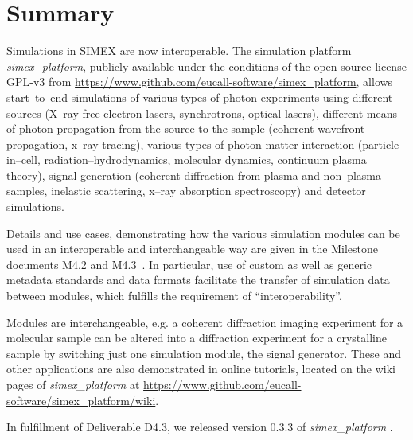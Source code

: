 \documentclass[10pt]{scrartcl}
\begin{document}

\section{Summary}
%
Simulations in SIMEX are now interoperable. The simulation platform
\textit{simex\_platform}, publicly available under the conditions of the open source
license GPL-v3 \cite{gplv3} from
\href{https://www.github.com/eucall-software/simex_platform}{https://www.github.com/eucall-software/simex\_platform},
allows start--to--end simulations of various types of photon experiments using
different sources (X--ray free electron lasers, synchrotrons, optical lasers),
different means of photon propagation from the source to the sample (coherent
wavefront propagation, x--ray tracing), various types of photon matter
interaction (particle--in--cell, radiation--hydrodynamics, molecular dynamics,
continuum plasma theory), signal generation (coherent diffraction from plasma
and non--plasma samples, inelastic scattering, x--ray absorption spectroscopy)
and detector simulations.

Details and use cases, demonstrating how the various
simulation modules can be used in an interoperable and interchangeable way are
given in the Milestone documents M4.2 \cite{EUCALL_SIMEX_M4.2} and
M4.3~\cite{EUCALL_SIMEX_M4.3}. In particular, use of custom as well as generic
metadata standards and data formats facilitate the transfer of simulation data
between modules, which fulfills the requirement of ``interoperability''.

Modules are interchangeable, e.g. a coherent diffraction
imaging experiment for a molecular sample can be altered into a diffraction
experiment for a crystalline sample by switching just one
simulation module, the signal generator.
These and other applications are also demonstrated in online tutorials, located
on the wiki pages of \textit{simex\_platform} at
\href{https://www.github.com/eucall-software/simex_platform/wiki}{https://www.github.com/eucall-software/simex\_platform/wiki}.

In fulfillment of Deliverable D4.3, we released version 0.3.3 of
\textit{simex\_platform} \cite{simex0.3.3}.

\printbibliography
\end{document}
